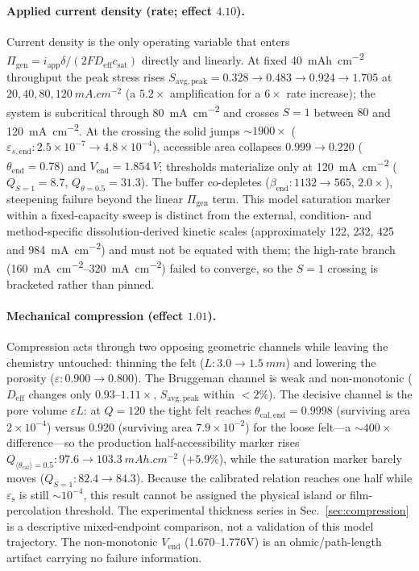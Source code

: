\documentclass[11pt]{article}
\newcommand{\epss}{\varepsilon_{\mathrm{s}}}
\newcommand{\csat}{c_{\mathrm{sat}}}
\newcommand{\epsl}{\varepsilon}
\newcommand{\Deff}{D_{\mathrm{eff}}}
\newcommand{\thetacal}{\theta_{\mathrm{cal}}}
\newcommand{\mAhcm}{\si{mAh.cm^{-2}}}
\begin{document}
\paragraph{Applied current density (rate; effect $4.10$).} Current density is the only operating variable that
enters $\Pi_{\mathrm{gen}}=i_{\mathrm{app}}\delta/(2FD_{\mathrm{eff}}\csat)$ directly and linearly. At fixed
\SI{40}{\mAhcm} throughput the peak stress rises $S_{\mathrm{avg,peak}}=0.328\to0.483\to0.924\to1.705$ at
$20,40,80,\SI{120}{mA.cm^{-2}}$ (a $5.2\times$ amplification for a $6\times$ rate increase); the system is
subcritical through \SI{80}{mA.cm^{-2}} and crosses $S=1$ between $80$ and \SI{120}{mA.cm^{-2}}. At the
crossing the solid jumps $\sim\!1900\times$ ($\varepsilon_{s,\mathrm{end}}:2.5\times10^{-7}\to4.8\times10^{-4}$),
accessible area collapses $0.999\to0.220$ ($\theta_{\mathrm{end}}=0.78$) and $V_{\mathrm{end}}=\SI{1.854}{V}$;
thresholds materialize only at \SI{120}{mA.cm^{-2}} ($Q_{S=1}=8.7$, $Q_{\theta=0.5}=31.3$). The buffer
co-depletes ($\beta_{\mathrm{end}}:1132\to565$, $2.0\times$), steepening failure beyond the linear
$\Pi_{\mathrm{gen}}$ term. This model saturation marker within a fixed-capacity sweep is distinct from the external,
condition- and method-specific dissolution-derived kinetic scales (approximately 122, 232, 425 and
\SI{984}{mA.cm^{-2}}) and must not be equated with them; the
high-rate branch (\SIrange{160}{320}{mA.cm^{-2}}) failed to converge, so the $S=1$ crossing is bracketed
rather than pinned.

\paragraph{Mechanical compression (effect $1.01$).} Compression acts through two opposing geometric channels
while leaving the chemistry untouched: thinning the felt ($L:3.0\to\SI{1.5}{mm}$) and lowering the porosity
($\epsl:0.900\to0.800$). The Bruggeman channel is weak and non-monotonic ($\Deff$ changes only
$\numrange{0.93}{1.11}\times$, $S_{\mathrm{avg,peak}}$ within $<\!2\%$). The decisive channel is the pore
volume $\epsl L$: at $Q=120$ the tight felt reaches $\theta_{\mathrm{cal,end}}=0.9998$ (surviving area
$2\times10^{-4}$) versus $0.920$ (surviving area $7.9\times10^{-2}$) for the loose felt---a $\sim\!400\times$
difference---so the production half-accessibility marker rises
$Q_{\langle\thetacal\rangle=0.5}:97.6\to\SI{103.3}{\mAhcm}$ ($+5.9\%$), while the saturation marker barely
moves ($Q_{S=1}:82.4\to84.3$). Because the calibrated relation reaches one half while $\epss$ is still
$\sim\!10^{-4}$, this result cannot be assigned the physical island or film-percolation threshold. The
experimental thickness series in Sec.~\ref{sec:compression} is a descriptive mixed-endpoint comparison, not
a validation of this model trajectory. The
non-monotonic $V_{\mathrm{end}}$ (\numrange{1.670}{1.776}{V}) is an ohmic/path-length artifact carrying no
failure information.
\end{document}
